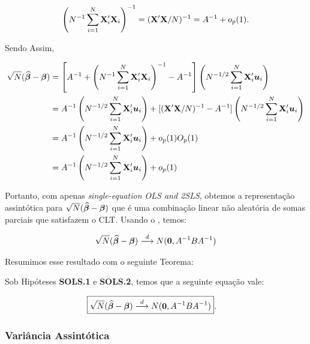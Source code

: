\documentclass[11pt, oneside, a4paper, article]{article}
\numberwithin{equation}{section}
\begin{document}
\vspace{-1 em}
\begin{align*} 
	\left( N^{-1} \sum_{i=1}^{N} \mathbf{X}_{i}' \mathbf{X}_{i} \right)^{-1} = (\mathbf{X}'\mathbf{X}/N)^{-1} = A^{-1} + o_{p}(1).
\end{align*}

\noindent
Sendo Assim,

\vspace{-1 em}
\begin{align*} 
\sqrt{N}(\widehat{\boldsymbol{\beta}} - \boldsymbol{\beta}) &= 
\left[ 
A^{-1} +
\left( N^{-1} \sum_{i=1}^{N} \mathbf{X}_{i}' \mathbf{X}_{i}   \right)^{-1}
- A^{-1}
\right]
\left( N^{-1/2} \sum_{i=1}^{N} \mathbf{X}_{i}' \boldsymbol{u}_{i}   \right)
\\ &=
A^{-1}\left( N^{-1/2} \sum_{i=1}^{N} \mathbf{X}_{i}' \boldsymbol{u}_{i}   \right)
+
[(\mathbf{X}'\mathbf{X}/N)^{-1} - A^{-1}]
\left( N^{-1/2} \sum_{i=1}^{N} \mathbf{X}_{i}' \boldsymbol{u}_{i}   \right)
\\&=
A^{-1}\left( N^{-1/2} \sum_{i=1}^{N} \mathbf{X}_{i}' \boldsymbol{u}_{i}   \right)
+ o_{p}(1) O_{p}(1)
\\&=
A^{-1}\left( N^{-1/2} \sum_{i=1}^{N} \mathbf{X}_{i}' \boldsymbol{u}_{i}   \right)
+ o_{p}(1)
\end{align*}

Portanto, com apenas \textit{single-equation OLS and 2SLS}, obtemos a representação assintótica para $\sqrt{N}(\widehat{\boldsymbol{\beta}} - \boldsymbol{\beta})$ que é uma combinação linear não aleatória de somas parciais que satisfazem o CLT.
Usando o , temos:

\begin{align*} 
\sqrt{N}(\widehat{\boldsymbol{\beta}} - \boldsymbol{\beta})
 \overset{d}{\longrightarrow} 
N(\boldsymbol{0}, A^{-1} B A^{-1})
\end{align*}

Resumimos esse resultado com o seguinte Teorema:

\begin{teo1}\label{teo:sols:norm}
Sob Hipóteses \textbf{SOLS.1} e \textbf{SOLS.2}, temos que a seguinte equação vale:

\begin{align} \label{eq:sols:norm}
	\Aboxed{
\sqrt{N}(\betahatbold - \betavec)
\arrowd
N(\mbs{0}, A^{-1} B A^{-1})
}.
\end{align}
\end{teo1}

\subsubsection{Variância Assintótica}
\end{document}
